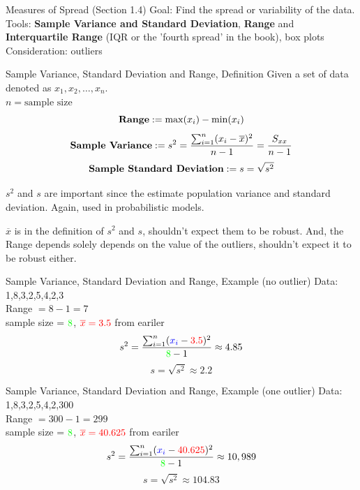 \documentclass{beamer}
\newcommand{\blue}[1]{{\color{blue} #1}}
\newcommand{\red}[1]{{\color{red} #1}}
\newcommand{\grn}[1]{{\color{green} #1}}
\newcommand{\nl}[1]{\vspace{#1 em}}
\newcommand{\defn}[1]{{\bf #1}}
\begin{document}
\begin{frame}{Measures of Spread (Section 1.4)}
    Goal: Find the spread or variability of the data.
    \nl{1}\\
    Tools: \defn{Sample Variance and Standard Deviation}, \defn{Range} and \defn{Interquartile Range} (IQR or the 'fourth spread' in the book), box plots
    \nl{1}\\
    Consideration: outliers
\end{frame}

\begin{frame}{Sample Variance, Standard Deviation and Range, Definition}
    Given a set of data denoted as $x_1, x_2, \ldots, x_n$. \\
    \nl{0.5}
    $n=\mbox{sample size}$\\
    \nl{0.5}
    \[\mbox{\bf{Range}} := \max(x_i) - \min(x_i)\]
    \[\mbox{\bf{Sample Variance}} := s^2 = \frac{\sum_{i=1}^n (x_i - \overline{x})^2}{n-1} = \frac{S_{xx}}{n-1}\]
    \[\mbox{\bf{Sample Standard Deviation}} := s = \sqrt{s^2}\]
    \begin{center}
        $s^2$ and $s$ are important since the estimate population variance and standard deviation. Again, used in probabilistic models.
    \end{center}
    \begin{center}
    $\overline{x}$ is in the definition of $s^2$ and $s$, shouldn't expect them to be robust. And, the Range depends solely depends on the value of the outliers, shouldn't expect it to be robust either.
    \end{center}
\end{frame}

\begin{frame}{Sample Variance, Standard Deviation and Range, Example (no outlier)}
    Data: \blue{1,8,3,2,5,4,2,3}\\
    \nl{0.5}
    Range $= 8-1 =7$\\
    \nl{0.5}
    sample size = $\grn{8}$, $\red{\overline{x} =3.5}$ from eariler
    \[s^2 = \frac{\sum_{i=1}^n (\blue{x_i} - \red{3.5})^2}{\grn{8}-1} \approx 4.85\]
    \[s = \sqrt{s^2} \approx 2.2\]
\end{frame}

\begin{frame}{Sample Variance, Standard Deviation and Range, Example (one outlier)}
    Data: \blue{1,8,3,2,5,4,2,300}\\
    \nl{0.5}
    Range $= 300-1 =299$\\
    \nl{0.5}
    sample size = $\grn{8}$, $\red{\overline{x} =40.625}$ from eariler
    \[s^2 = \frac{\sum_{i=1}^n (\blue{x_i} - \red{40.625})^2}{\grn{8}-1} \approx 10,989\]
    \[s = \sqrt{s^2} \approx 104.83\]
\end{frame}
\end{document}
